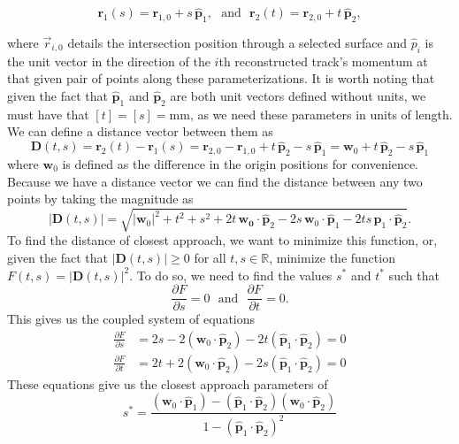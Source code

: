 \documentclass[12pt]{article}
\begin{document}
\begin{equation}
\mathbf{r}_1(s) = \mathbf{r}_{1,0} + s\,\hat{\mathbf{p}}_1, \ \ \ \text{and} \ \ \  \mathbf{r}_2(t) = \mathbf{r}_{2,0} + t\,\hat{\mathbf{p}}_2,
\end{equation}

where $\vec{r}_{i,0}$ details the intersection position through a selected surface and $\hat{p}_{i}$ is the unit vector in the direction of the $i$th reconstructed track's momentum at that given pair of points along these parameterizations. It is worth noting that given the fact that $\hat{\mathbf{p}}_1$ and $\hat{\mathbf{p}}_2$ are both unit vectors defined without units, we must have that $[t]=[s]=\text{mm}$, as we need these parameters in units of length. We can define a distance vector between them as
$$
\mathbf{D}(t,s) = \mathbf{r}_2(t) - \mathbf{r}_1(s) = \mathbf{r}_{2,0} - \mathbf{r}_{1,0} +t\,\hat{\mathbf{p}}_2 - s\,\hat{\mathbf{p}}_1 = \mathbf{w}_0 +t\,\hat{\mathbf{p}}_2 - s\,\hat{\mathbf{p}}_1
$$
where $\mathbf{w}_0$ is defined as the difference in the origin positions for convenience. Because we have a distance vector we can find the distance between any two points by taking the magnitude as
$$
\left|\mathbf{D}(t,s)\right| = \sqrt{|\mathbf{w}_0|^2+t^2+s^2+2t\,\mathbf{w_0}\cdot\hat{\mathbf{p}}_2-2s\, \mathbf{w}_0\cdot\hat{\mathbf{p}}_1-2ts\,\hat{\mathbf{p}}_1\cdot\hat{\mathbf{p}}_2}.
$$
To find the distance of closest  approach, we want to minimize this function, or, given the fact that $|\mathbf{D}(t,s)| \geq 0$ for all $t,s\in \mathbb{R}$, minimize the function $F(t,s)= |\mathbf{D}(t,s)|^2$. To do so, we need to find the values $s^*$ and $t^*$ such that
$$
\frac{\partial F}{\partial s} = 0 \ \ \ \text{and} \ \ \ \frac{\partial F}{\partial t} = 0.
$$
This gives us the coupled system of equations
\begin{align*}
    \frac{\partial F}{\partial s} &= 2s - 2\left(\mathbf{w}_0\cdot\hat{\mathbf{p}}_2\right)-2t\left(\hat{\mathbf{p}}_1\cdot\hat{\mathbf{p}}_2\right) = 0 \\
    \frac{\partial F}{\partial t} &= 2t +2\left(\mathbf{w}_0\cdot\hat{\mathbf{p}}_2 \right)-2s\left(\hat{\mathbf{p}}_1\cdot \hat{\mathbf{p}}_2\right) = 0
\end{align*}
These equations give us the closest approach parameters of
\begin{equation}\label{eqn:closestSValue}
    s^* = \frac{\left(\mathbf{w}_0\cdot\hat{\mathbf{p}}_1\right)-\left(\hat{\mathbf{p}}_1\cdot\hat{\mathbf{p}}_2\right)\left(\mathbf{w}_0\cdot\hat{\mathbf{p}}_2\right)}{1-\left(\hat{\mathbf{p}}_1\cdot\hat{\mathbf{p}}_2\right)^2}
\end{equation}
\end{document}
